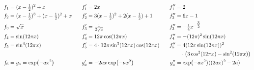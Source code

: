 \fontsize{10}{12}\selectfont
\begin{alignat*}{3}
	f_1 &=(x-\tfrac{1}{2})^2+x
		& f_1' &=2x
		& f_1'' &=2 \\
	f_2 &=(x-\tfrac{1}{2})^3+(x-\tfrac{1}{2})^2+x \hspace{0.3cm}
		& f_2' &= 3(x-\tfrac{1}{2})^2+2(x-\tfrac{1}{2})+1
		& f_2'' &= 6x-1\\
	f_3 &= \sqrt{x}
		& f_3' &=\tfrac{1}{2\sqrt{x}}
		& f_3'' &=-\tfrac{1}{4}x^{-\tfrac{3}{2}} \\
	f_4 &= \sin(12\pi x)
		& f_4' &= 12 \pi \cos(12\pi x)
		& f_4'' &= -(12\pi)^2 \sin(12\pi x)\\
	f_5 &= \sin^4(12\pi x)
		& f_5' &= 4 \cdot 12\pi \sin^3(12\pi x) \cos(12\pi x) \hspace{0.3cm}
		&  f_5'' &= 4  (12\pi \sin(12\pi x))^2 \\ & & & & &~~~\cdot\big(3\cos^2(12\pi x) - \sin^2(12\pi x) \big) \\
	f_6 &=g_a = \exp(-ax^2)
		& g_a' &= -2ax\exp(-ax^2)
		& g_a'' &= \exp(-ax^2) ((2ax)^2-2a)\\
\end{alignat*}


\fontsize{12}{14}\selectfont

